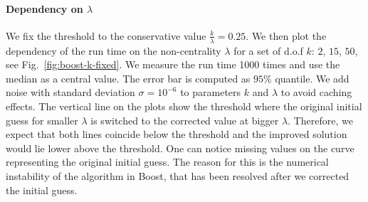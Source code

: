 \documentclass[final,5p,twocolumn,preprint,nopreprintline,times,authoryear]{elsarticle}
\begin{document}
\paragraph{Dependency on $\lambda$} We fix the threshold to the conservative value  $\frac{k}{\lambda} = 0.25$. We then plot the dependency of the run time on the non-centrality $\lambda$ for a set of d.o.f $k$: $2$, $15$, $50$, see Fig.~\ref{fig:boost-k-fixed}. We measure the run time 1000 times and use the median as a central value. The error bar is computed as $95\%$ quantile. We add noise with standard deviation $\sigma = 10^{-6}$ to parameters $k$ and $\lambda$ to avoid caching effects. The vertical line on the plots show the threshold where the original initial guess for smaller $\lambda$ is switched to the corrected value at bigger $\lambda$. Therefore, we expect that both lines coincide below the threshold and the improved solution would lie lower above the threshold. One can notice missing values on the curve representing the original initial guess. The reason for this is the numerical instability of the algorithm in Boost, that has been resolved after we corrected the initial guess.
%
\end{document}
